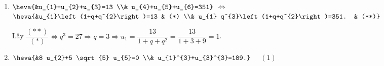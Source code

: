 \begin{vd}
{\begin{enumerate}
			$\Leftrightarrow \dfrac{\left[(1+q)\left(1+q^{2}\right)\right]^{2}}{\left(1+q^{2}\right)+\left(1+q^{4}\right)}=\dfrac{45}{17} \Leftrightarrow \dfrac{(1+q)^{2}\left(1+q^{2}\right)}{1+q^{4}}=\dfrac{45}{17}$
			
			$ \Leftrightarrow \dfrac{\left(1+2 q+q^{2}\right)\left(1+q^{2}\right)}{1+q^{4}}=\dfrac{45}{17}$
			
			$\Leftrightarrow 17\left(1+q^{2}+2 q+2 q^{3}+q^{2}+q^{4}\right)=45\left(1+q^{4}\right)$
			
			$\Leftrightarrow 28 q^{4}-34 q^{3}-34 q^{2}-34 q+28=0 \Leftrightarrow \dfrac{28 q^{4}}{q^{2}}-\dfrac{34 q^{3}}{q^{2}}-\dfrac{34 q^{2}}{q^{2}}-\dfrac{34 q}{q^{2}}+\dfrac{28}{q^{2}}=0$ (vì dễ dàng thấy $q \neq 0)$
			
			$\Leftrightarrow 28 q^{2}-34 q-34-\dfrac{34}{q}+28=0 \Leftrightarrow 14\left(q^{2}+\dfrac{1}{q^{2}}\right)-17\left(q+\dfrac{1}{q}\right)-17=0 \quad (*)$
			
			Đặt $t=q+\dfrac{1}{q} \Rightarrow t^{2}=\left(q+\dfrac{1}{q}\right)^{2} \Rightarrow q^{2}+\dfrac{1}{q^{2}}=t^{2}-2$. Điều kiện: $|t| \geq 2$.
			
			$(*) \Leftrightarrow 14\left(t^{2}-2\right)-17 t-17=0 \Leftrightarrow 14 t^{2}-17 t-45=0 \Leftrightarrow \hoac{&t=\dfrac{5}{2} \\& t=-\dfrac{9}{7}. \quad (\text{Loại})}$ 
			
			Với $t=\dfrac{5}{2} \Rightarrow q+\dfrac{1}{q}=\dfrac{5}{2} \Leftrightarrow 2 q^{2}-5 q+2=0 \Leftrightarrow \hoac{&q=2 \\& q=\dfrac{1}{2}.}$
			\begin{itemize}
				\item Với $q=2 \Rightarrow u_{1}=1$.
				\item Với $q=\dfrac{1}{2} \Rightarrow u_{1}=\dfrac{15}{1+q+q^{2}+q^{3}}=8$.
			\end{itemize}
			\item $ \heva{&u_{1}+u_{2}+u_{3}=13 \\& u_{4}+u_{5}+u_{6}=351} $ $ \Leftrightarrow $
			$ \heva{&u_{1}\left(1+q+q^{2}\right)=13 & (*) \\& u_{1} q^{3}\left(1+q+q^{2}\right)=351. & (**)} $
			
			Lấy $\dfrac{(* *)}{(*)} \Leftrightarrow q^{3}=27 \Rightarrow q=3 \Rightarrow u_{1}=\dfrac{13}{1+q+q^{2}}=\dfrac{13}{1+3+9}=1$.
			\item $ \heva{&8 u_{2}+5 \sqrt{5} u_{5}=0 \\& u_{1}^{3}+u_{3}^{3}=189.} $ $ \quad (1) $ 
			

\end{enumerate}}
\end{vd}

